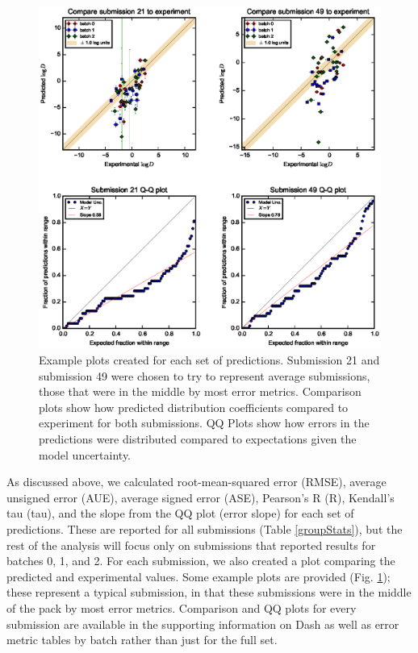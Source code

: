\begin{figure} 
\includegraphics{ExamplePlots.eps} 
\caption{Example plots created for each set of predictions. Submission 21 \cite{Konig:sampl5} and submission 49 \cite{Santos-Martins:sampl5} were chosen to try to represent average submissions, those that were in the middle by most error metrics. Comparison plots show how predicted distribution coefficients compared to experiment for both submissions. QQ Plots show how errors in the predictions were distributed compared to expectations given the model uncertainty.}
\label{examplePlots}       
\end{figure}

As discussed above, we calculated root-mean-squared error (RMSE), average unsigned error (AUE), average signed error (ASE), Pearson's R (R), Kendall's tau (tau), and the slope from the QQ plot (error slope) for each set of predictions.
These are reported for all submissions (Table \ref{groupStats}), 
but the rest of the analysis will focus only on submissions that reported results for batches 0, 1, and 2.
For each submission, we also created a plot comparing the predicted and experimental values.
Some example plots are provided (Fig. \ref{examplePlots}); these represent a typical submission, in that these submissions were in the middle of the pack by most error metrics. 
Comparison and QQ plots for every submission are available in the supporting information on Dash as well as error metric tables by batch rather than just for the full set. 

